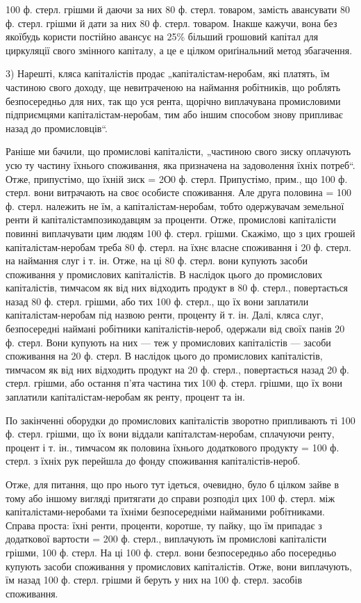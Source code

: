 \parcont{}  %
100 ф. стерл. грішми й даючи за них 80 ф. стерл. товаром, замість авансувати 80 ф. стерл. грішми й
дати за них 80 ф. стерл. товаром. Інакше кажучи, вона без якоїбудь користи постійно авансує на 25\%
більший грошовий капітал для циркуляції свого змінного капіталу, а це е цілком ориґінальний метод
збагачення.

3) Нарешті, кляса капіталістів продає „капіталістам-неробам, які платять, їм частиною свого доходу,
ще невитраченою на наймання робітників, що роблять безпосередньо для них, так що уся рента, щорічно
виплачувана промисловими підприємцями капіталістам-неробам, тим або іншим способом знову припливає
назад до промисловців“.

Раніше ми бачили, що промислові капіталісти, „частиною свого зиску оплачують усю ту частину їхнього
споживання, яка призначена на задоволення їхніх потреб“. Отже, припустімо, що їхній зиск = 2О0 ф.
стерл. Припустімо, прим., що 100 ф. стерл. вони витрачають на своє особисте споживання. Але друга
половина = 100 ф. стерл. належить не їм, а капіталістам-неробам, тобто одержувачам земельної ренти й
капіталістампозикодавцям
за проценти. Отже, промислові капіталісти повинні виплачувати цим людям 100 ф. стерл. грішми.
Скажімо, що з цих грошей капіталістам-неробам треба 80 ф. стерл. на їхнє власне споживання і 20 ф.
стерл. на наймання слуг і т. ін. Отже, на ці 80 ф. стерл. вони купують засоби споживання у
промислових капіталістів. В наслідок цього до промислових капіталістів, тимчасом як від них
відходить продукт в 80 ф. стерл., повертається назад 80 ф. стерл. грішми, або  тих 100 ф. стерл.,
що їх вони заплатили капіталістам-неробам під назвою ренти, проценту й т. ін. Далі, кляса слуг,
безпосередні наймані робітники капіталістів-нероб, одержали від своїх панів 20 ф. стерл. Вони
купують на них — теж у промислових капіталістів — засоби споживання на 20 ф. стерл. В наслідок цього
до промислових капіталістів, тимчасом як від них відходить продукт на 20 ф. стерл., повертається
назад 20 ф. стерл. грішми, або остання п’ята частина тих 100 ф. стерл. грішми, що їх вони заплатили
капіталістам-неробам як ренту, процент та ін.

По закінченні оборудки до промислових капіталістів зворотно припливають ті 100 ф. стерл. грішми, що
їх вони віддали капіталстам-неробам, сплачуючи ренту, процент і т. ін., тимчасом як половина їхнього
додаткового продукту = 100 ф. стерл. з їхніх рук перейшла до фонду споживання капіталістів-нероб.

Отже, для питання, що про нього тут ідеться, очевидно, було б цілком зайве в тому або іншому вигляді
притягати до справи розподіл цих 100 ф. стерл. між капіталістами-неробами та їхніми безпосередніми
найманими робітниками. Справа проста: їхні ренти, проценти, коротше, ту пайку, що їм припадає з
додаткової вартости = 200 ф. стерл., виплачують їм промислові капіталісти грішми, 100 ф. стерл. На
ці 100 ф. стерл. вони безпосередньо або посередньо купують засоби споживання у промислових
капіталістів. Отже, вони виплачують, їм назад 100 ф. стерл. грішми й беруть у них на 100 ф. стерл.
засобів споживання.
